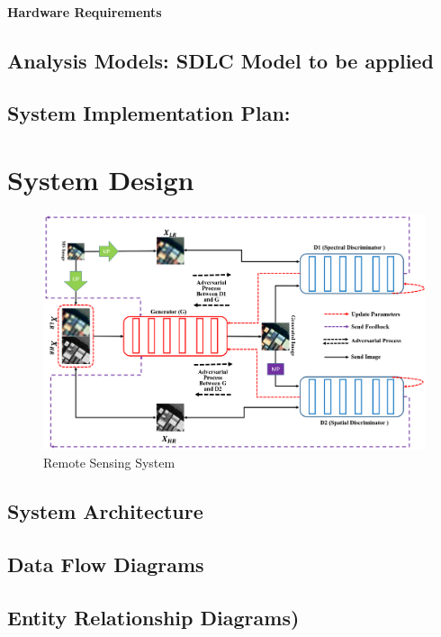 \documentclass[oneside,a4paper,12pt]{report}
\begin{document}
\subsubsection{Hardware Requirements}
 
\section{Analysis Models: SDLC Model to be applied}
\section{System Implementation Plan:}

\chapter{System Design}
\begin{figure}[H]
\begin{center}
\includegraphics[width=1.0\linewidth]{GAN_ARCH}
\caption{Remote Sensing System}
\label{Fig:f1}
\end{center}
\end{figure}

\section{System Architecture}  
\section{Data Flow Diagrams}  
	
\section{Entity Relationship Diagrams)}   
\end{document}
